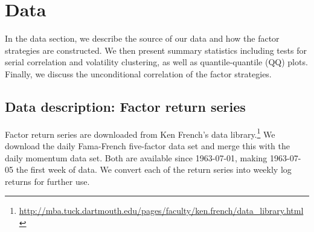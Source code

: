 \section{Data}

In the data section, we describe the source of our data and how the factor strategies are constructed. We then present summary statistics including tests for serial correlation and volatility clustering, as well as quantile-quantile (QQ) plots. Finally, we discuss the unconditional correlation of the factor strategies.

\subsection{Data description: Factor return series}

Factor return series are downloaded from Ken French's data library.\footnote{\url{http://mba.tuck.dartmouth.edu/pages/faculty/ken.french/data_library.html}} We download the daily Fama-French five-factor data set and merge this with the daily momentum data set. Both are available since 1963-07-01, making 1963-07-05 the first week of data. We convert each of the return series into weekly log returns for further use. 

